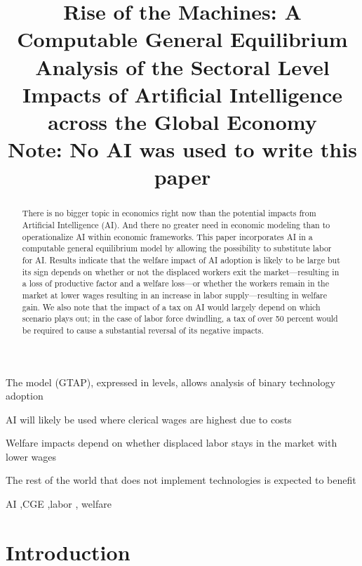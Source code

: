 \documentclass[
  authoryear,
  doubleblind]{elsarticle}
\begin{document}
\begin{frontmatter}
\title{Rise of the Machines: A Computable General Equilibrium Analysis
of the Sectoral Level Impacts of Artificial Intelligence across the
Global Economy \\\large{Note: No AI was used to write this paper} }

        
\begin{abstract}
There is no bigger topic in economics right now than the potential
impacts from Artificial Intelligence (AI). And there no greater need in
economic modeling than to operationalize AI within economic frameworks.
This paper incorporates AI in a computable general equilibrium model by
allowing the possibility to substitute labor for AI. Results indicate
that the welfare impact of AI adoption is likely to be large but its
sign depends on whether or not the displaced workers exit the
market---resulting in a loss of productive factor and a welfare
loss---or whether the workers remain in the market at lower wages
resulting in an increase in labor supply---resulting in welfare gain. We
also note that the impact of a tax on AI would largely depend on which
scenario plays out; in the case of labor force dwindling, a tax of over
50 percent would be required to cause a substantial reversal of its
negative impacts.
\end{abstract}



\begin{highlights}
\item The model (GTAP), expressed in levels, allows analysis of binary
technology adoption\item AI will likely be used where clerical wages are
highest due to costs\item Welfare impacts depend on whether displaced
labor stays in the market with lower wages\item The rest of the world
that does not implement technologies is expected to benefit
\end{highlights}


\begin{keyword}
    AI \sep CGE \sep labor \sep 
    welfare
\end{keyword}
\end{frontmatter}
    

\section{Introduction}\label{introduction}
\end{document}

